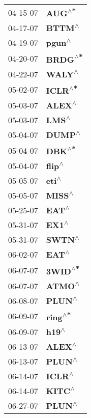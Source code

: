 \begin{supertabular}{p{0.08\textwidth}p{0.2\textwidth}}
 04-15-07 &    \textbf{AUG\textsuperscript{$\wedge$*}} \\
 04-17-07 &    \textbf{BTTM\textsuperscript{$\wedge$}} \\
 04-19-07 &    \textbf{pgun\textsuperscript{$\wedge$}} \\
 04-20-07 &   \textbf{BRDG\textsuperscript{$\wedge$*}} \\
 04-22-07 &    \textbf{WALY\textsuperscript{$\wedge$}} \\
 05-02-07 &   \textbf{ICLR\textsuperscript{$\wedge$*}} \\
 05-03-07 &    \textbf{ALEX\textsuperscript{$\wedge$}} \\
 05-03-07 &     \textbf{LMS\textsuperscript{$\wedge$}} \\
 05-04-07 &    \textbf{DUMP\textsuperscript{$\wedge$}} \\
 05-04-07 &    \textbf{DBK\textsuperscript{$\wedge$*}} \\
 05-04-07 &    \textbf{flip\textsuperscript{$\wedge$}} \\
 05-05-07 &     \textbf{eti\textsuperscript{$\wedge$}} \\
 05-05-07 &    \textbf{MISS\textsuperscript{$\wedge$}} \\
 05-25-07 &     \textbf{EAT\textsuperscript{$\wedge$}} \\
 05-31-07 &     \textbf{EX1\textsuperscript{$\wedge$}} \\
 05-31-07 &    \textbf{SWTN\textsuperscript{$\wedge$}} \\
 06-02-07 &     \textbf{EAT\textsuperscript{$\wedge$}} \\
 06-07-07 &   \textbf{3WID\textsuperscript{$\wedge$*}} \\
 06-07-07 &    \textbf{ATMO\textsuperscript{$\wedge$}} \\
 06-08-07 &    \textbf{PLUN\textsuperscript{$\wedge$}} \\
 06-09-07 &   \textbf{ring\textsuperscript{$\wedge$*}} \\
 06-09-07 &     \textbf{h19\textsuperscript{$\wedge$}} \\
 06-13-07 &    \textbf{ALEX\textsuperscript{$\wedge$}} \\
 06-13-07 &    \textbf{PLUN\textsuperscript{$\wedge$}} \\
 06-14-07 &    \textbf{ICLR\textsuperscript{$\wedge$}} \\
 06-14-07 &    \textbf{KITC\textsuperscript{$\wedge$}} \\
 06-27-07 &    \textbf{PLUN\textsuperscript{$\wedge$}} \\

\end{supertabular}
